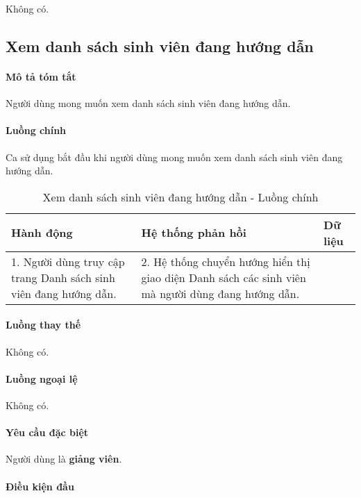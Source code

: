 \documentclass[./../main.tex]{subfiles}
\begin{document}
Không có.

\subsection{Xem danh sách sinh viên đang hướng dẫn}

\paragraph*{Mô tả tóm tắt}

Người dùng mong muốn xem danh sách sinh viên đang hướng dẫn.

\paragraph*{Luồng chính} Ca sử dụng bắt đầu khi người dùng mong muốn xem danh sách sinh viên đang hướng dẫn.

\begin{table}[H]
  \caption{Xem danh sách sinh viên đang hướng dẫn - Luồng chính}
  \label{tab:view_assigned_students}
  \begin{tabularx}{\textwidth}{|X|X|X|}
    \hline
\textbf{Hành động} & \textbf{Hệ thống phản hồi} & \textbf{Dữ liệu} \\ \hline
1. Người dùng truy cập trang Danh sách sinh viên đang hướng dẫn. & 2. Hệ thống chuyển hướng hiển thị giao diện Danh sách các sinh viên mà người dùng đang hướng dẫn. &  \\ \hline
  \end{tabularx}
\end{table}

\paragraph*{Luồng thay thế} Không có.

\paragraph*{Luồng ngoại lệ} Không có.

\paragraph*{Yêu cầu đặc biệt}

Người dùng là \textbf{giảng viên}.

\paragraph*{Điều kiện đầu}
\end{document}
